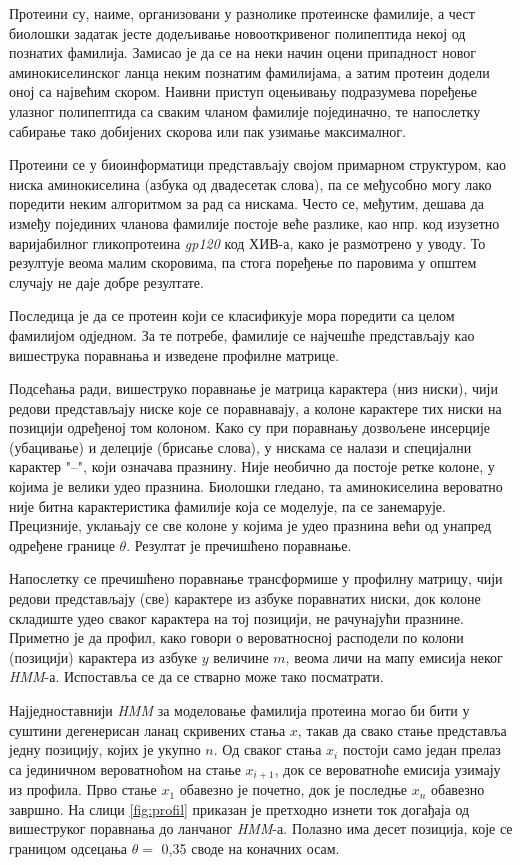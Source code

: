 \documentclass[12pt,oneside]{memoir}
\begin{document}
\begin{CJK}{UTF8}{ipxm}
Протеини су, наиме, организовани у разнолике протеинске фамилије, а чест биолошки задатак јесте додељивање новооткривеног полипептида некој од познатих фамилија. Замисао је да се на неки начин оцени припадност новог аминокиселинског ланца неким познатим фамилијама, а затим протеин додели оној са највећим скором. Наивни приступ оцењивању подразумева поређење улазног полипептида са сваким чланом фамилије појединачно, те напослетку сабирање тако добијених скорова или пак узимање максималног.

Протеини се у биоинформатици представљају својом примарном структуром, као ниска аминокиселина (азбука од двадесетак слова), па се међусобно могу лако поредити неким алгоритмом за рад са нискама. Често се, међутим, дешава да између појединих чланова фамилије постоје веће разлике, као нпр. код изузетно варијабилног гликопротеина \textit{gp120} код ХИВ-а, како је размотрено у уводу. То резултује веома малим скоровима, па стога поређење по паровима у општем случају не даје добре резултате.

Последица је да се протеин који се класификује мора поредити са целом фамилијом одједном. За те потребе, фамилије се најчешће представљају као вишеструка поравнања и изведене профилне матрице.

Подсећања ради, вишеструко поравнање је матрица карактера (низ ниски), чији редови представљају ниске које се поравнавају, а колоне карактере тих ниски на позицији одређеној том колоном. Како су при поравнању дозвољене инсерције (убацивање) и делеције (брисање слова), у нискама се налази и специјални карактер "--", који означава празнину. Није необично да постоје ретке колоне, у којима је велики удео празнина. Биолошки гледано, та аминокиселина вероватно није битна карактеристика фамилије која се моделује, па се занемарује. Прецизније, уклањају се све колоне у којима је удео празнина већи од унапред одређене границе $\theta$. Резултат је пречишћено поравнање.

Напослетку се пречишћено поравнање трансформише у профилну матрицу, чији редови представљају (све) карактере из азбуке поравнатих ниски, док колоне складиште удео сваког карактера на тој позицији, не рачунајући празнине. Приметно је да профил, како говори о вероватносној расподели по колони (позицији) карактера из азбуке $y$ величине $m$, веома личи на мапу емисија неког \textit{HMM}-а. Испоставља се да се стварно може тако посматрати.

Најједноставнији \textit{HMM} за моделовање фамилија протеина могао би бити у суштини дегенерисан ланац скривених стања $x$, такав да свако стање представља једну позицију, којих је укупно $n$. Од сваког стања $x_i$ постоји само један прелаз са јединичном вероватноћом на стање $x_{i+1}$, док се вероватноће емисија узимају из профила. Прво стање $x_1$ обавезно је почетно, док је последње $x_n$ обавезно завршно. На слици \ref{fig:profil} приказан је претходно изнети ток догађаја од вишеструког поравнања до ланчаног \textit{HMM}-а. Полазно има десет позиција, које се границом одсецања $\theta =$ 0,35 своде на коначних осам.


\end{CJK}
\end{document}
